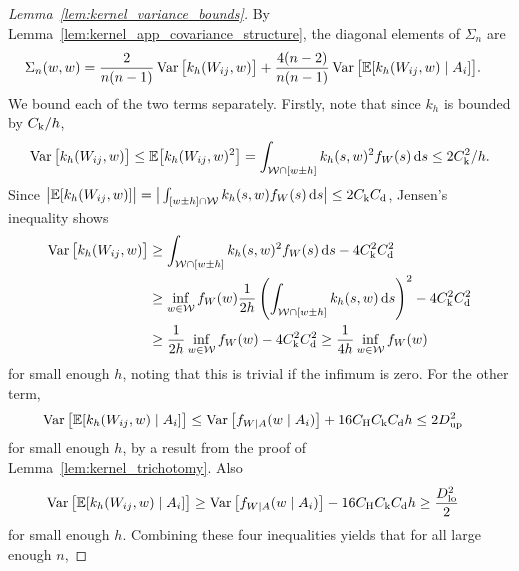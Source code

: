 \begin{proof}[Lemma~\ref{lem:kernel_variance_bounds}]

  By Lemma~\ref{lem:kernel_app_covariance_structure},
  the diagonal elements of $\Sigma_n$ are
  \begin{align*}
    \Sigma_n(w,w)
    &=
    \frac{2}{n(n-1)}
    \operatorname{Var}\big[
      k_h(W_{i j},w)
    \big]
    +
    \frac{4(n-2)}{n(n-1)}
    \operatorname{Var}\big[
      \mathbb{E}[k_h(W_{i j},w) \mid A_i]
    \big].
  \end{align*}
  We bound each of the two terms separately.
  Firstly, note that since $k_h$ is bounded by $C_{\mathrm{k}}/h$,
  \begin{align*}
    \operatorname{Var}\big[
      k_h(W_{i j},w)
    \big]
    \leq
    \mathbb{E}\big[
      k_h(W_{i j},w)^2
    \big]
    =
    \int_{\mathcal{W} \cap [w \pm h]}
    k_h(s,w)^2
    f_W(s)
    \,\mathrm{d}s
    \leq 2 C_{\mathrm{k}}^2 / h.
  \end{align*}
  Since $\big|\mathbb{E}[k_h(W_{i j},w)]\big|
  = \big|\int_{[w \pm h] \cap \mathcal{W}} k_h(s,w) f_W(s) \,\mathrm{d}s\big|
  \leq 2 C_{\mathrm{k}} C_{\mathrm{d}}$, Jensen's inequality shows
  \begin{align*}
    \operatorname{Var}\big[
      k_h(W_{i j},w)
    \big]
    &\geq
    \int_{\mathcal{W} \cap [w \pm h]}
    k_h(s,w)^2
    f_W(s)
    \,\mathrm{d}s
    - 4 C_{\mathrm{k}}^2 C_{\mathrm{d}}^2 \\
    &\geq
    \inf_{w \in \mathcal{W}} f_W(w)
    \frac{1}{2h}
    \left(
      \int_{\mathcal{W} \cap [w \pm h]}
      k_h(s,w)
      \,\mathrm{d}s
    \right)^2
    - 4 C_{\mathrm{k}}^2 C_{\mathrm{d}}^2 \\
    &\geq
    \frac{1}{2h}
    \inf_{w \in \mathcal{W}} f_W(w)
    - 4 C_{\mathrm{k}}^2 C_{\mathrm{d}}^2
    \geq
    \frac{1}{4h}
    \inf_{w \in \mathcal{W}} f_W(w)
  \end{align*}
  for small enough $h$, noting that this is trivial if the infimum is zero.
  For the other term,
  \begin{align*}
    \operatorname{Var}\big[
      \mathbb{E}[k_h(W_{i j},w) \mid A_i]
    \big]
    &\leq
    \operatorname{Var}\big[
      f_{W \mid A}(w \mid A_i)
    \big]
    + 16 C_{\mathrm{H}} C_{\mathrm{k}} C_{\mathrm{d}} h
    \leq
    2 D_{\textup{up}}^2
  \end{align*}
  for small enough $h$, by a result from
  the proof of Lemma~\ref{lem:kernel_trichotomy}.
  Also
  \begin{align*}
    \operatorname{Var}\big[
      \mathbb{E}[k_h(W_{i j},w) \mid A_i]
    \big]
    &\geq
    \operatorname{Var}\big[
      f_{W \mid A}(w \mid A_i)
    \big]
    - 16 C_{\mathrm{H}} C_{\mathrm{k}} C_{\mathrm{d}} h
    \geq
    \frac{D_{\textup{lo}}^2}{2}
  \end{align*}
  for small enough $h$.
  Combining these four inequalities yields
  that for all large enough $n$,

\end{proof}
